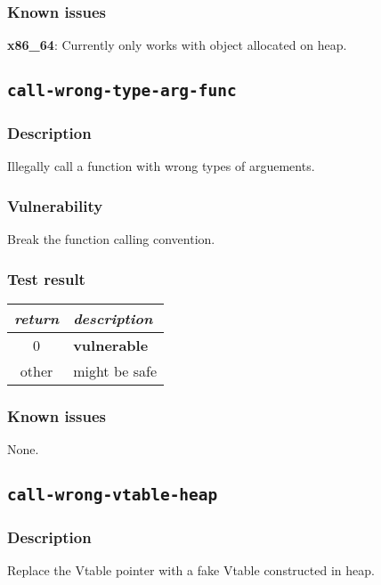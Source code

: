 \documentclass[a4paper]{book}
\begin{document}
\subsubsection{Known issues}
\textbf{x86\_64}: Currently only works with object allocated on heap.

\newpage

\subsection{\texttt{call-wrong-type-arg-func}}\label{test-call-wrong-type-arg-func}

\subsubsection{Description}
Illegally call a function with wrong types of arguements.

\subsubsection{Vulnerability}
Break the function calling convention.

\subsubsection{Test result}
\begin{tabular}{cl}
  \toprule
  \emph{return}  & \emph{description} \\
  \midrule
  0              & \textbf{vulnerable} \\
  other          & might be safe \\
  \bottomrule
\end{tabular}

\subsubsection{Known issues}
None.

\newpage

\subsection{\texttt{call-wrong-vtable-heap}}\label{test-call-wrong-vtable-heap}

\subsubsection{Description}
Replace the Vtable pointer with a fake Vtable constructed in heap.
\end{document}

